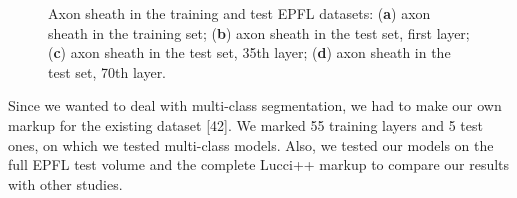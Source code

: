 \documentclass[journal,article,submit,pdftex,moreauthors]{Definitions/mdpi}
\begin{document}
\begin{figure}[H]
	\hspace{0.1cm}
	\hspace{0.1cm}
	\hspace{0.1cm}
	\caption{Axon sheath in the training and test EPFL datasets: (\textbf{a})  axon sheath in the training set; (\textbf{b}) axon sheath in the test set, first layer; (\textbf{c}) axon sheath in the test set, 35th layer; (\textbf{d}) axon sheath in the test set, 70th layer.\label{fig3}}
\end{figure}

Since we wanted to deal with multi-class segmentation, we had to make our own markup for the existing dataset [42]. We marked 55 training layers and 5 test ones, on which we tested multi-class models. Also, we tested our models on the full EPFL test volume and the complete Lucci++ markup to compare our results with other studies.
\end{document}
